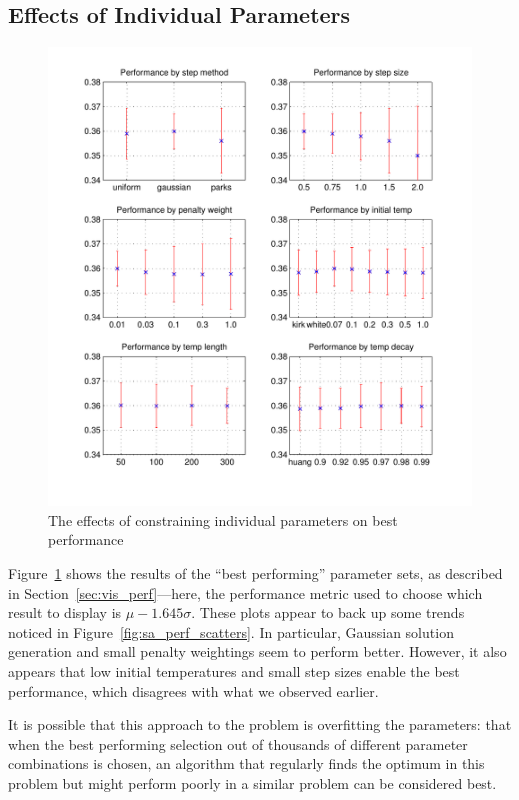 \documentclass[10pt]{article}
\begin{document}
\subsection{Effects of Individual Parameters}

\begin{figure}
  \begin{center}
    \includegraphics[width=13cm]{sa_plots.pdf}
    \end{center}
    \caption{The effects of constraining individual parameters on best
    performance}
    \label{fig:sa_plots}
    \end{figure}

Figure~\ref{fig:sa_plots} shows the results of the ``best performing''
parameter sets, as described in Section~\ref{sec:vis_perf}---here, the
performance metric used to choose which result to display is $\mu - 1.645
\sigma$. These plots appear to back up some trends noticed in
Figure~\ref{fig:sa_perf_scatters}. In particular, Gaussian solution generation
and small penalty weightings seem to perform better. However, it also appears
that low initial temperatures and small step sizes enable the best
performance, which disagrees with what we observed earlier.

It is possible that this approach to the problem is overfitting the
parameters: that when the best performing selection out of thousands of
different parameter combinations is chosen, an algorithm that regularly finds
the optimum in this problem but might perform poorly in a similar problem can
be considered best.
\end{document}
